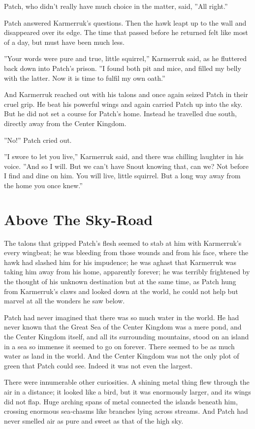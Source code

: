 \documentclass[12pt]{book}
\begin{document}
Patch, who didn't really have much choice in the matter, said, ''All right.''

Patch answered Karmerruk's questions. Then the hawk leapt up to the wall and disappeared over its edge. The time that passed before he returned felt like most of a day, but must have been much less.

''Your words were pure and true, little squirrel,'' Karmerruk said, as he fluttered back down into Patch's prison. ''I found both pit and mice, and filled my belly with the latter. Now it is time to fulfil my own oath.''

And Karmerruk reached out with his talons and once again seized Patch in their cruel grip. He beat his powerful wings and again carried Patch up into the sky. But he did not set a course for Patch's home. Instead he travelled due south, directly away from the Center Kingdom.

''No!'' Patch cried out.

''I swore to let you live,'' Karmerruk said, and there was chilling laughter in his voice. ''And so I will. But we can't have Snout knowing that, can we? Not before I find and dine on him. You will live, little squirrel. But a long way away from the home you once knew.''


\section{Above The Sky-Road}

The talons that gripped Patch's flesh seemed to stab at him with Karmerruk's every wingbeat; he was bleeding from those wounds and from his face, where the hawk had slashed him for his impudence; he was aghast that Karmerruk was taking him away from his home, apparently forever; he was terribly frightened by the thought of his unknown destination %
but at the same time, as Patch hung from Karmerruk's claws and looked down at the world, he could not help but marvel at all the wonders he saw below.

Patch had never imagined that there was so much water in the world. He had never known that the Great Sea of the Center Kingdom was a mere pond, and the Center Kingdom itself, and all its surrounding mountains, stood on an island in a sea so immense it seemed to go on forever. There seemed to be as much water as land in the world. And the Center Kingdom was not the only plot of green that Patch could see. Indeed it was not even the largest.

There were innumerable other curiosities. A shining metal thing flew through the air in a distance; it looked like a bird, but it was enormously larger, and its wings did not flap. Huge arching spans of metal connected the islands beneath him, crossing enormous sea-chasms like branches lying across streams. And Patch had never smelled air as pure and sweet as that of the high sky.
\end{document}
